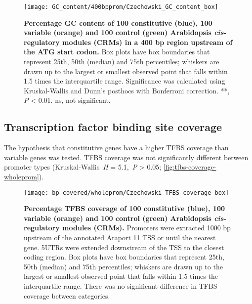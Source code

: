 \documentclass[../main.tex]{subfiles}
\begin{document}
\begin{figure}[hbt!]
	\begin{center}
		\capstart
		\texttt{[image: GC\_content/400bpprom/Czechowski\_GC\_content\_box]}
		\caption{
			\textbf{Percentage GC content of 100 constitutive (blue), 100 variable (orange) and 100 control (green) Arabidopsis \textit{cis}\hyp{}regulatory modules (CRMs) in a 400 bp region upstream of the ATG start codon.}
			Box plots have box boundaries that represent 25th, 50th (median) and 75th percentiles; whiskers are drawn up to the largest or smallest observed point that falls within 1.5 times the interquartile range.
			Significance was calculated using Kruskal\hyp{}Wallis and Dunn's posthocs with Bonferroni correction.
			**, \textit{P} \textless{} 0.01. ns, not significant.
			\label{fig:gc-content-400bpprom}
		}
	\end{center}
\end{figure}




\subsection{Transcription factor binding site coverage}
The hypothesis that constitutive genes have a higher TFBS coverage than variable genes was tested.
TFBS coverage was not significantly different between promoter types (Kruskal\hyp{}Wallis~\textit{H} = 5.1,~\textit{P} \textgreater{} 0.05; \autoref{fig:tfbs-coverage-wholeprom}).

\begin{figure}[hbt!]
	\begin{center}
		\capstart
		\texttt{[image: bp\_covered/wholeprom/Czechowski\_TFBS\_coverage\_box]}
		\caption{
			\textbf{Percentage TFBS coverage of 100 constitutive (blue), 100 variable (orange) and 100 control (green) Arabidopsis \textit{cis}\hyp{}regulatory modules (CRMs).}
			Promoters were extracted 1000 bp upstream of the annotated Araport 11 \autocite{chengAraport11CompleteReannotation2017} TSS or until the nearest gene.
			5UTRs were extended downstream of the TSS to the closest coding region.  Box plots have box boundaries that represent 25th, 50th (median) and 75th percentiles; whiskers are drawn up to the largest or smallest observed point that falls within 1.5 times the interquartile range.
			There was no significant difference in TFBS coverage between categories.
			\label{fig:tfbs-coverage-wholeprom}
		}
	\end{center}
\end{figure}
\end{document}
